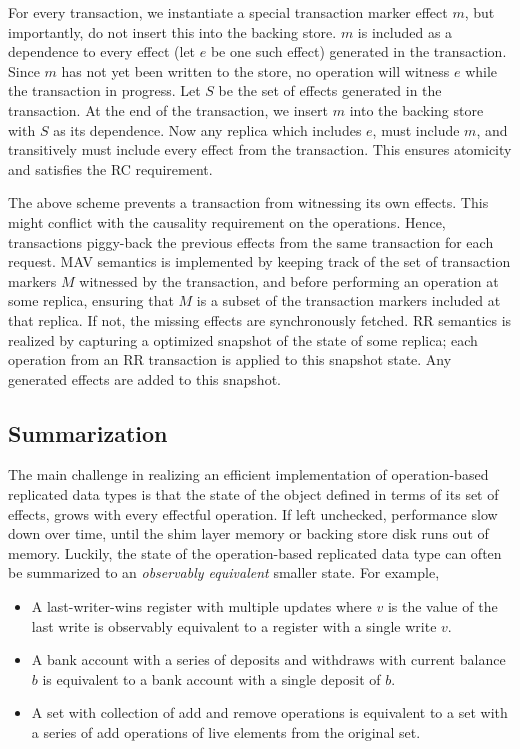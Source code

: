 For every transaction, we instantiate a special transaction marker effect
$m$, but importantly, do not insert this into the backing store. $m$ is
included as a dependence to every effect (let $e$ be one such effect)
generated in the transaction. Since $m$ has not yet been written to the
store, no operation will witness $e$ while the transaction in progress. Let
$S$ be the set of effects generated in the transaction. At the end of the
transaction, we insert $m$ into the backing store with $S$ as its
dependence. Now any replica which includes $e$, must include $m$, and
transitively must include every effect from the transaction. This ensures
atomicity and satisfies the RC requirement.

The above scheme prevents a transaction from witnessing its own effects. This
might conflict with the causality requirement on the operations. Hence,
transactions piggy-back the previous effects from the same transaction for each
request. MAV semantics is implemented by keeping track of the set of
transaction markers $M$ witnessed by the transaction, and before performing an
operation at some replica, ensuring that $M$ is a subset of the transaction
markers included at that replica. If not, the missing effects are synchronously
fetched. RR semantics is realized by capturing a optimized snapshot of the
state of some replica; each operation from an RR transaction is applied to this
snapshot state. Any generated effects are added to this snapshot.

\subsection{Summarization}

The main challenge in realizing an efficient implementation of
operation-based replicated data types is that the state of the object
defined in terms of its set of effects, grows with every effectful
operation. If left unchecked, performance slow down over time, until the
shim layer memory or backing store disk runs out of memory. Luckily, the
state of the operation-based replicated data type can often be summarized to
an \emph{observably equivalent} smaller state. For example,

\begin{itemize}
\setlength{\itemsep}{2pt}
\item A last-writer-wins register with multiple updates where $v$ is the value
of the last write is observably equivalent to a register with a single write
$v$.

\item A bank account with a series of deposits and withdraws with current
balance $b$ is equivalent to a bank account with a single deposit of $b$.

\item A set with collection of add and remove operations is equivalent to a set
with a series of add operations of live elements from the original set.
\end{itemize}

